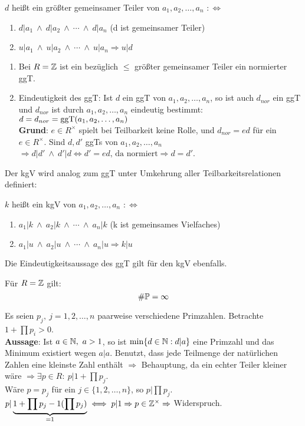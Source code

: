 \documentclass[a4paper,twoside,DIV15,BCOR12mm]{scrbook}
\begin{document}
\begin{definition}
    $d$ heißt ein größter gemeinsamer Teiler von
    $a_1,a_2,\dotsc,a_n$ $:\iff$
    \begin{enumerate}
        \item $d|a_1\ \wedge\ d|a_2\ \wedge\ \dotsb \ \wedge\ d|a_n$
        (d ist gemeinsamer Teiler)
        \item $u|a_1\ \wedge\ u|a_2\ \wedge\ \dotsb \ \wedge\ u|a_n \Rightarrow u|d$
    \end{enumerate}
\end{definition}
\begin{bemerkung}
    \begin{enumerate}
        \item Bei $R=\mathbb{Z}$ ist ein bezüglich $\leq$ größter
        gemeinsamer Teiler ein normierter ggT.
        \item Eindeutigkeit des ggT: Ist $d$ ein ggT von
        $a_1,a_2,\dotsc,a_n$, so ist auch $d_{nor}$ ein ggT und $d_{nor}$
        ist durch $a_1,a_2,\dotsc,a_n$ eindeutig bestimmt:
        $d=d_{nor}=\mathop{\rm ggT}\nolimits(a_1,a_2,\dotsc,a_n)$\\
        \textbf{Grund}: $e \in R^{\times}$ spielt bei Teilbarkeit keine Rolle, und
        $d_{nor}=ed$ für ein $e \in R^{\times}$. Sind $d,d'$ ggTs von $a_1,a_2,\dotsc,a_n$
        $\Rightarrow d|d'\ \wedge\ d'|d \iff d'=ed\text{, da
        normiert}\Rightarrow d=d'$.
    \end{enumerate}
\end{bemerkung}
Der kgV wird analog zum ggT unter Umkehrung aller
Teilbarkeitsrelationen definiert:

\begin{definition}
    $k$ heißt ein kgV von $a_1,a_2,\dotsc,a_n$ $:\iff$
        \begin{enumerate}
        \item $a_1|k\ \wedge\ a_2|k\ \wedge\ \dotsb \ \wedge\ a_n|k$
        (k ist gemeinsames Vielfaches)
        \item $a_1|u\ \wedge\ a_2|u\ \wedge\ \dotsb \ \wedge\ a_n|u \Rightarrow k|u$
    \end{enumerate}
\end{definition}
Die Eindeutigkeitsaussage des ggT gilt für den kgV ebenfalls.

\begin{satz}
    Für $R=\mathbb{Z}$ gilt:
    \[\#\mathbb{P}=\infty\]
\end{satz}
\begin{beweis}
    Es seien $p_j,\ j=1,2,\dotsc,n$ paarweise verschiedene Primzahlen.
    Betrachte $1+\prod p_i>0$.\\
    \textbf{Aussage}: Ist $a\in \mathbb{N},\ a > 1$, so ist $\min\{d\in \mathbb{N}:
    d|a\}$ eine Primzahl und das Minimum existiert wegen $a|a$.
    Benutzt, dass jede Teilmenge der natürlichen Zahlen eine
    kleinste Zahl enthält $\Rightarrow$ Behauptung, da ein echter Teiler
    kleiner wäre  $\Rightarrow \exists p \in R:\ p|1+\prod p_j$.\\
    Wäre $p=p_j$ für ein $j\in\{1,2,\dotsc,n\}$, so $p|\prod p_j$.
    $p|\underbrace{1+\prod p_j-1(\prod p_j)}_{=1} \iff p|1
    \Rightarrow p\in \mathbb{Z}^{\times} \Rightarrow$ Widerspruch.
\end{beweis}
\end{document}
